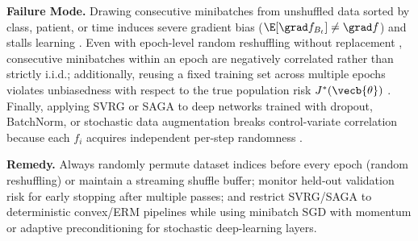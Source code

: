 \documentclass[../../../../master.tex]{subfiles}
\begin{document}
\begin{pitfall}
\textbf{Failure Mode.} Drawing consecutive minibatches from unshuffled data sorted by class, patient, or time induces severe gradient bias ($\E[\grad f_{B_t}] \ne \grad f$) and stalls learning . Even with epoch-level random reshuffling without replacement  , consecutive minibatches within an epoch are negatively correlated rather than strictly i.i.d.; additionally, reusing a fixed training set across multiple epochs violates unbiasedness with respect to the true population risk $J^*(\vecb{\theta})$ . Finally, applying SVRG or SAGA to deep networks trained with dropout, BatchNorm, or stochastic data augmentation breaks control-variate correlation because each $f_i$ acquires independent per-step randomness .

\textbf{Remedy.} Always randomly permute dataset indices before every epoch (random reshuffling) or maintain a streaming shuffle buffer; monitor held-out validation risk for early stopping after multiple passes; and restrict SVRG/SAGA to deterministic convex/ERM pipelines while using minibatch SGD with momentum or adaptive preconditioning for stochastic deep-learning layers.
\end{pitfall}
\end{document}
